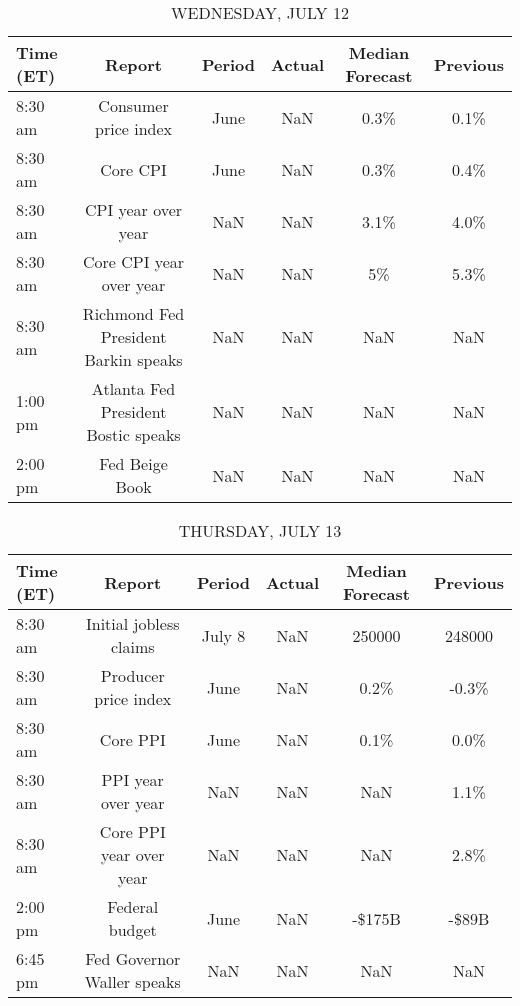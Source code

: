 \documentclass{article}%
\begin{document}
\begin{table}[htbp]%
\caption{WEDNESDAY, JULY 12}%
\centering%
\begin{adjustbox}{width=1\textwidth}%
\begin{tabular}{lccccc}
\toprule
Time (ET) &                               Report & Period & Actual & Median Forecast & Previous \\
\midrule
  8:30 am &                 Consumer price index &   June &    NaN &            0.3\% &     0.1\% \\
  8:30 am &                             Core CPI &   June &    NaN &            0.3\% &     0.4\% \\
  8:30 am &                   CPI year over year &    NaN &    NaN &            3.1\% &     4.0\% \\
  8:30 am &              Core CPI year over year &    NaN &    NaN &              5\% &     5.3\% \\
  8:30 am & Richmond Fed President Barkin speaks &    NaN &    NaN &             NaN &      NaN \\
  1:00 pm &  Atlanta Fed President Bostic speaks &    NaN &    NaN &             NaN &      NaN \\
  2:00 pm &                       Fed Beige Book &    NaN &    NaN &             NaN &      NaN \\
\bottomrule
\end{tabular}
%
\end{adjustbox}%
\end{table}

%


\begin{table}[htbp]%
\caption{THURSDAY, JULY 13}%
\centering%
\begin{adjustbox}{width=1\textwidth}%
\begin{tabular}{lccccc}
\toprule
Time (ET) &                     Report & Period & Actual & Median Forecast & Previous \\
\midrule
  8:30 am &     Initial jobless claims & July 8 &    NaN &          250000 &   248000 \\
  8:30 am &       Producer price index &   June &    NaN &            0.2\% &    -0.3\% \\
  8:30 am &                   Core PPI &   June &    NaN &            0.1\% &     0.0\% \\
  8:30 am &         PPI year over year &    NaN &    NaN &             NaN &     1.1\% \\
  8:30 am &    Core PPI year over year &    NaN &    NaN &             NaN &     2.8\% \\
  2:00 pm &             Federal budget &   June &    NaN &          -\$175B &    -\$89B \\
  6:45 pm & Fed Governor Waller speaks &    NaN &    NaN &             NaN &      NaN \\
\bottomrule
\end{tabular}
%
\end{adjustbox}%
\end{table}
\end{document}
